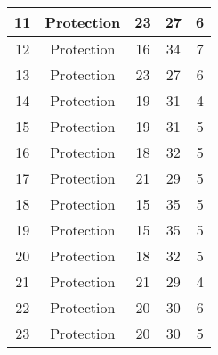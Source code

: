 \documentclass[results.tex]{subfiles}
\begin{document}
\begin{center}
\begin{tabular}{| c || c | c | c | c |}
            \hline
            11                      & Protection                   & 23                     & 27                      & 6                    \\
            \hline
            12                      & Protection                   & 16                     & 34                      & 7                    \\
            \hline
            13                      & Protection                   & 23                     & 27                      & 6                    \\
            \hline
            14                      & Protection                   & 19                     & 31                      & 4                    \\
            \hline
            15                      & Protection                   & 19                     & 31                      & 5                    \\
            \hline
            16                      & Protection                   & 18                     & 32                      & 5                    \\
            \hline
            17                      & Protection                   & 21                     & 29                      & 5                    \\
            \hline
            18                      & Protection                   & 15                     & 35                      & 5                    \\
            \hline
            19                      & Protection                   & 15                     & 35                      & 5                    \\
            \hline
            20                      & Protection                   & 18                     & 32                      & 5                    \\
            \hline
            21                      & Protection                   & 21                     & 29                      & 4                    \\
            \hline
            22                      & Protection                   & 20                     & 30                      & 6                    \\
            \hline
            23                      & Protection                   & 20                     & 30                      & 5                    \\

\end{tabular}
\end{center}
\end{document}

